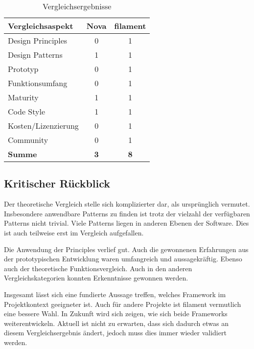 \begin{table}[h!]
    \centering
    \caption{Vergleichsergebnisse}
    \label{tab:vergleichsergebnisse}
    \begin{tabular}{|l|c|c|}
        \hline
        \textbf{Vergleichsaspekt} & \textbf{Nova} & \textbf{filament} \\ \hline
        Design Principles         & 0             & 1                 \\ \hline
        Design Patterns           & 1             & 1                 \\ \hline
        Prototyp                  & 0             & 1                 \\ \hline
        Funktionsumfang           & 0             & 1                 \\ \hline
        Maturity                  & 1             & 1                 \\ \hline
        Code Style                & 1             & 1                 \\ \hline
        Kosten/Lizenzierung       & 0             & 1                 \\ \hline
        Community                 & 0             & 1                 \\ \hline
        \textbf{Summe}            & \textbf{3}    & \textbf{8}        \\ \hline
    \end{tabular}
\end{table}

\newpage

\subsection{Kritischer Rückblick}
Der theoretische Vergleich stelle sich komplizierter dar, als ursprünglich vermutet.
Insbesondere anwendbare Patterns zu finden ist trotz der vielzahl der verfügbaren Patterns nicht trivial.
Viele Patterns liegen in anderen Ebenen der Software.
Dies ist auch teilweise erst im Vergleich aufgefallen.

Die Anwendung der Principles verlief gut.
Auch die gewonnenen Erfahrungen aus der prototypischen Entwicklung waren umfangreich und aussagekräftig.
Ebenso auch der theoretische Funktionsvergleich.
Auch in den anderen Vergleichskategorien konnten Erkenntnisse gewonnen werden.

Insgesamt lässt sich eine fundierte Aussage treffen, welches Framework im Projektkontext geeigneter ist.
Auch für andere Projekte ist filament vermutlich eine bessere Wahl.
In Zukunft wird sich zeigen, wie sich beide Frameworks weiterentwickeln.
Aktuell ist nicht zu erwarten, dass sich dadurch etwas an diesem Vergleichsergebnis ändert, jedoch muss dies immer wieder validiert werden.

